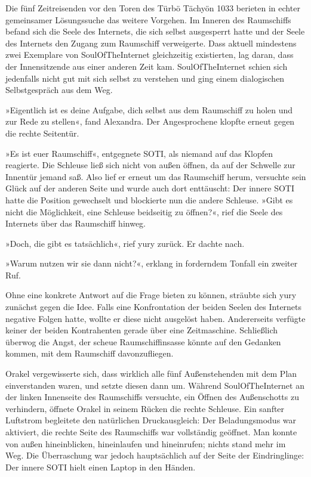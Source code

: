 Die fünf Zeitreisenden vor den Toren des Türbö Tächyön 1033 berieten in echter gemeinsamer Lösungssuche das weitere Vorgehen. Im Inneren des Raumschiffs befand sich die Seele des Internets, die sich selbst ausgesperrt hatte und der Seele des Internets den Zugang zum Raumschiff verweigerte. Dass aktuell mindestens zwei Exemplare von SoulOfTheInternet gleichzeitig existierten, lag daran, dass der Innensitzende aus einer anderen Zeit kam. SoulOfTheInternet schien sich jedenfalls nicht gut mit sich selbst zu verstehen und ging einem dialogischen Selbstgespräch aus dem Weg.

»Eigentlich ist es deine Aufgabe, dich selbst aus dem Raumschiff zu holen und zur Rede zu stellen«, fand Alexandra. Der Angesprochene klopfte erneut gegen die rechte Seitentür.

»Es ist euer Raumschiff«, entgegnete SOTI, als niemand auf das Klopfen reagierte. Die Schleuse ließ sich nicht von außen öffnen, da auf der Schwelle zur Innentür jemand saß. Also lief er erneut um das Raumschiff herum, versuchte sein Glück auf der anderen Seite und wurde auch dort enttäuscht: Der innere SOTI hatte die Position gewechselt und blockierte nun die andere Schleuse. »Gibt es nicht die Möglichkeit, eine Schleuse beidseitig zu öffnen?«, rief die Seele des Internets über das Raumschiff hinweg.

»Doch, die gibt es tatsächlich«, rief yury zurück. Er dachte nach.

»Warum nutzen wir sie dann nicht?«, erklang in forderndem Tonfall ein zweiter Ruf.

Ohne eine konkrete Antwort auf die Frage bieten zu können, sträubte sich yury zunächst gegen die Idee. Falls eine Konfrontation der beiden Seelen des Internets negative Folgen hatte, wollte er diese nicht ausgelöst haben. Andererseits verfügte keiner der beiden Kontrahenten gerade über eine Zeitmaschine. Schließlich überwog die Angst, der scheue Raumschiffinsasse könnte auf den Gedanken kommen, mit dem Raumschiff davonzufliegen.

Orakel vergewisserte sich, dass wirklich alle fünf Außenstehenden mit dem Plan einverstanden waren, und setzte diesen dann um. Während SoulOfTheInternet an der linken Innenseite des Raumschiffs versuchte, ein Öffnen des Außenschotts zu verhindern, öffnete Orakel in seinem Rücken die rechte Schleuse. Ein sanfter Luftstrom begleitete den natürlichen Druckausgleich: Der Beladungsmodus war aktiviert, die rechte Seite des Raumschiffs war vollständig geöffnet. Man konnte von außen hineinblicken, hineinlaufen und hineinrufen; nichts stand mehr im Weg. Die Überraschung war jedoch hauptsächlich auf der Seite der Eindringlinge: Der innere SOTI hielt einen Laptop in den Händen.

